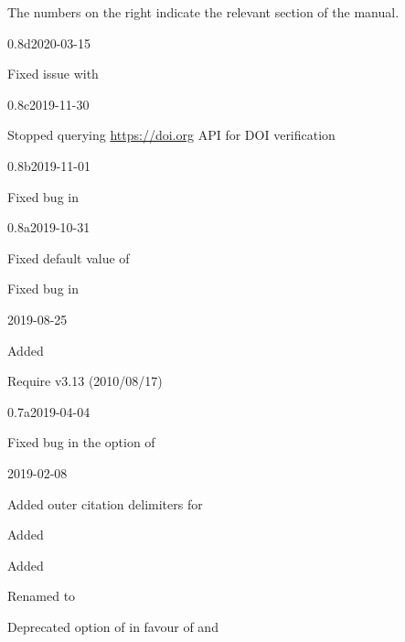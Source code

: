 \documentclass[DIV=9]{scrartcl}
\begin{document}
The numbers on the right indicate the relevant section of the manual.
\begin{changelog}
\begin{release}{0.8d}{2020-03-15}
  \item Fixed issue with 
\end{release}
\begin{release}{0.8c}{2019-11-30}
  \item Stopped querying \url{https://doi.org} API for DOI
    verification
\end{release}
\begin{release}{0.8b}{2019-11-01}
  \item Fixed bug in %
\end{release}
\begin{release}{0.8a}{2019-10-31}
  \item Fixed default value of 
  \item Fixed bug in %
\end{release}
\begin{release}{0.8}{2019-08-25}
  \item Added  
  \item Require  v3.13 (2010/08/17)
\end{release}
\begin{release}{0.7a}{2019-04-04}
  \item Fixed bug in the  option of %
\end{release}
\begin{release}{0.7}{2019-02-08}
  \item Added outer citation delimiters for %
  \item Added 
  \item Added 
  \item Renamed   to
  \item Deprecated option  of  in
    favour of  and 

\end{release}
\end{changelog}
\end{document}
